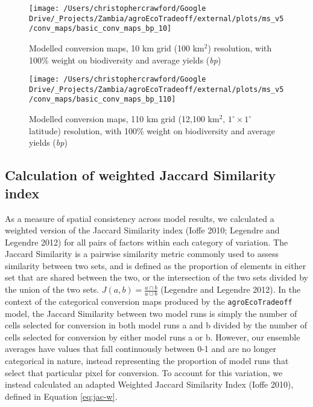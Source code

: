 \documentclass[
]{article}
\begin{document}
\begin{figure}
\texttt{[image: /Users/christophercrawford/Google Drive/\_Projects/Zambia/agroEcoTradeoff/external/plots/ms\_v5/conv\_maps/basic\_conv\_maps\_bp\_10]} \caption{Modelled conversion maps, 10 km grid (100 km\(^2\)) resolution, with 100\% weight on biodiversity and average yields (\emph{bp})}\label{fig:conv-maps-10-bp}
\end{figure}

\begin{figure}
\texttt{[image: /Users/christophercrawford/Google Drive/\_Projects/Zambia/agroEcoTradeoff/external/plots/ms\_v5/conv\_maps/basic\_conv\_maps\_bp\_110]} \caption{Modelled conversion maps, 110 km grid (12,100 km\(^2\), \(1^{\circ}\times1^{\circ}\) latitude) resolution, with 100\% weight on biodiversity and average yields (\emph{bp})}\label{fig:conv-maps-110-bp}
\end{figure}

\newpage

\hypertarget{calculation-of-weighted-jaccard-similarity-index}{%
\subsection{Calculation of weighted Jaccard Similarity index}\label{calculation-of-weighted-jaccard-similarity-index}}

As a measure of spatial consistency across model results, we calculated a weighted version of the Jaccard Similarity index (Ioffe 2010; Legendre and Legendre 2012) for all pairs of factors within each category of variation. The Jaccard Similarity is a pairwise similarity metric commonly used to assess similarity between two sets, and is defined as the proportion of elements in either set that are shared between the two, or the intersection of the two sets divided by the union of the two sets. \(J(a,b) = \frac{a\cap b}{a\cup b}\) (Legendre and Legendre 2012). In the context of the categorical conversion maps produced by the \texttt{agroEcoTradeoff} model, the Jaccard Similarity between two model runs is simply the number of cells selected for conversion in both model runs a and b divided by the number of cells selected for conversion by either model runs a or b. However, our ensemble averages have values that fall continuously between 0-1 and are no longer categorical in nature, instead representing the proportion of model runs that select that particular pixel for conversion. To account for this variation, we instead calculated an adapted Weighted Jaccard Similarity Index (Ioffe 2010), defined in Equation \eqref{eq:jac-w}.
\end{document}
